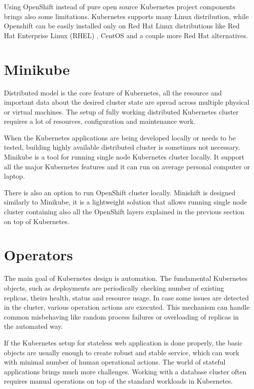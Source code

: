 \documentclass[
  digital, %
  twoside, %
  table,   %
  lof,     %
  lot,     %
]{fithesis3}
\begin{document}
Using OpenShift instead of pure open source Kubernetes project components brings also some limitations. Kubernetes supports many Linux distribution, while Openshift can be easily installed only on Red Hat Linux distributions like Red Hat Enterprise Linux (RHEL) \cite{rhel}, CentOS \cite{centos} and a couple more Red Hat alternatives.

\section{Minikube}
Distributed model is the core feature of Kubernetes, all the resource and important data about the desired cluster state are spread across multiple physical or virtual machines. The setup of fully working distributed Kubernetes cluster requires a lot of resources, configuration and maintenance work.

When the Kubernetes applications are being developed locally or needs to be tested, building highly available distributed cluster is sometimes not necessary. Minikube \cite{minikube} is a tool for running single node Kubernetes cluster locally. It support all the major Kubernetes features and it can run on average personal computer or laptop.

There is also an option to run OpenShift cluster locally. Minishift \cite{minishift} is designed similarly to Minikube, it is a lightweight solution that allows running single node cluster containing also all the OpenShift layers explained in the previous section on top of Kubernetes.

\section{Operators} \label{sec:operators}
The main goal of Kubernetes design is automation. The fundamental Kubernetes objects, such as deployments are periodically checking number of existing replicas, theirs health, status and resource usage. In case some issues are detected in the cluster, various operation actions are executed. This mechanism can handle common misbehaving like random process failures or overloading of replicas in the automated way.

If the Kubernetes setup for stateless web application is done properly, the basic objects are usually enough to create robust and stable service, which can work with minimal number of human operational actions. The world of stateful applications brings much more challenges. Working with a database cluster often requires manual operations on top of the standard workloads in Kubernetes.
\end{document}

